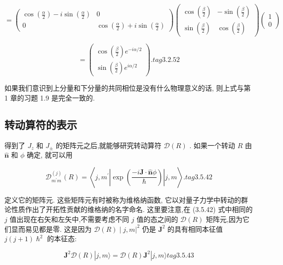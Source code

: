 $$
= \left( \begin{matrix} \cos \left( \frac{\alpha }{2}\right) - i\sin \left( \frac{\alpha }{2}\right) & 0 \\ 0 & \cos \left( \frac{\alpha }{2}\right) + i\sin \left( \frac{\alpha }{2}\right) \end{matrix}\right) \left( \begin{matrix} \cos \left( \frac{\beta }{2}\right) & - \sin \left( \frac{\beta }{2}\right) \\ \sin \left( \frac{\beta }{2}\right) & \cos \left( \frac{\beta }{2}\right) \end{matrix}\right) \left( \begin{array}{l} 1 \\ 0 \end{array}\right)
$$

$$
= \left( \begin{array}{l} \cos \left( \frac{\beta }{2}\right) {e}^{-{i\alpha }/2} \\ \sin \left( \frac{\beta }{2}\right) {e}^{{i\alpha }/2} \end{array}\right) . tag{3. 2.52}
$$

如果我们意识到上分量和下分量的共同相位是没有什么物理意义的话, 则上式与第 1 章的习题 1.9 是完全一致的.


\subsection{转动算符的表示}

得到了 ${J}_{z}$ 和 ${J}_{ \pm }$ 的矩阵元之后,就能够研究转动算符 $\mathcal{D}\left( R\right)$ . 如果一个转动 $R$ 由 $\widehat{\mathbf{n}}$ 和 $\phi$ 确定, 就可以用

$$
{\mathcal{D}}_{{m}^{\prime }m}^{\left( j\right) }\left( R\right) = \left\langle {j,{m}^{\prime }\left| {\exp \left( \frac{-i\mathbf{J} \cdot \widehat{\mathbf{n}}\phi }{\hslash }\right) }\right| j, m}\right\rangle . tag{3. 5.42}
$$

定义它的矩阵元. 这些矩阵元有时被称为维格纳函数, 它以对量子力学中转动的群论性质作出了开拓性贡献的维格纳的名字命名. 这里要注意,在 (3.5.42) 式中相同的 $j$ 值出现在右矢和左矢中,不需要考虑不同 $j$ 值的态之间的 $\mathcal{D}\left( R\right)$ 矩阵元,因为它们显而易见都是零. 这是因为 ${\left. \mathcal{D}\left( R\right) \mid j, m\right| }^{2}$ 仍是 ${\mathbf{J}}^{2}$ 的具有相同本征值 $j\left( {j + 1}\right) {\hslash }^{2}$ 的本征态:

$$
{\mathbf{J}}^{2}\mathcal{D}\left( R\right) \left| {j, m\rangle = \mathcal{D}\left( R\right) {\mathbf{J}}^{2}}\right| j, m\rangle tag{3. 5.43}
$$

